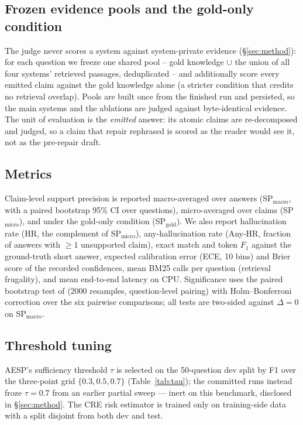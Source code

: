 \subsection{Frozen evidence pools and the gold-only condition}
The judge never scores a system against system-private evidence
(\S\ref{sec:method}): for each question we freeze one shared pool --
gold knowledge $\cup$ the union of all four systems' retrieved passages,
deduplicated -- and additionally score every emitted claim against the
gold knowledge alone (a stricter condition that credits no retrieval
overlap).  Pools are built once from the finished run and persisted, so
the main systems and the ablations are judged against byte-identical
evidence.  The unit of evaluation is the \emph{emitted} answer: its atomic
claims are re-decomposed and judged, so a claim that repair rephrased is
scored as the reader would see it, not as the pre-repair draft.

\subsection{Metrics}
Claim-level support precision is reported macro-averaged over answers
(SP$_{\text{macro}}$, with a paired bootstrap 95\% CI over questions),
micro-averaged over claims (SP$_{\text{micro}}$), and under the gold-only
condition (SP$_{\text{gold}}$).  We also report hallucination rate (HR,
the complement of SP$_{\text{micro}}$), any-hallucination rate (Any-HR,
fraction of answers with $\ge 1$ unsupported claim), exact match and
token $F_1$ against the ground-truth short answer, expected calibration
error (ECE, 10 bins) and Brier score of the recorded confidences, mean
BM25 calls per question (retrieval frugality), and mean end-to-end
latency on CPU.  Significance uses the paired bootstrap test of
\cite{koehn2004statistical} (2000 resamples, question-level pairing)
with Holm--Bonferroni correction over the six pairwise comparisons; all
tests are two-sided against $\Delta = 0$ on SP$_{\text{macro}}$.

\subsection{Threshold tuning}
AESP's sufficiency threshold $\tau$ is selected on the 50-question dev
split by F1 over the three-point grid $\{0.3, 0.5, 0.7\}$
(Table~\ref{tab:tau}); the committed runs instead froze $\tau{=}0.7$
from an earlier partial sweep --- inert on this benchmark, disclosed in
\S\ref{sec:method}.  The CRE risk estimator is trained only on
training-side data with a split disjoint from both dev and test.
